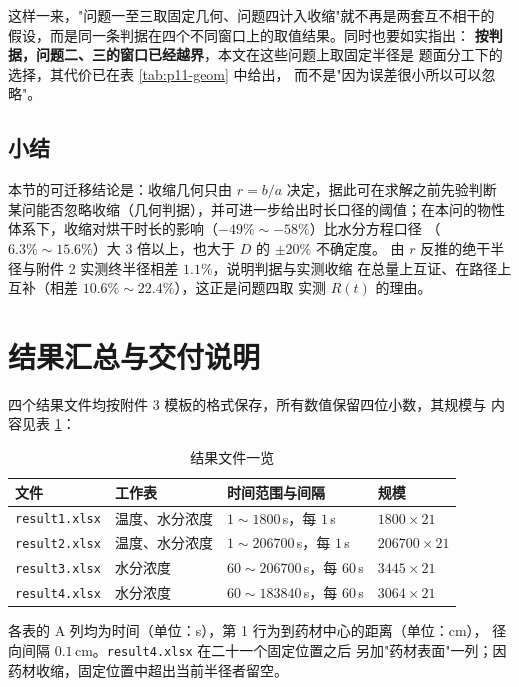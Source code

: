 \documentclass[12pt,a4paper,fontset=none]{ctexart}
\begin{document}
这样一来，"问题一至三取固定几何、问题四计入收缩"就不再是两套互不相干的
假设，而是同一条判据在四个不同窗口上的取值结果。同时也要如实指出：
\textbf{按判据，问题二、三的窗口已经越界}，本文在这些问题上取固定半径是
题面分工下的选择，其代价已在表 \ref{tab:p11-geom} 中给出，
而不是"因为误差很小所以可以忽略"。

\subsection{小结}

本节的可迁移结论是：收缩几何只由 $r=b/a$ 决定，据此可在求解之前先验判断
某问能否忽略收缩（几何判据），并可进一步给出时长口径的阈值；在本问的物性
体系下，收缩对烘干时长的影响（$-49\%\sim-58\%$）比水分方程口径
（$6.3\%\sim15.6\%$）大 $3$ 倍以上，也大于 $D$ 的 $\pm20\%$ 不确定度。
由 $r$ 反推的绝干半径与附件 2 实测终半径相差 $1.1\%$，说明判据与实测收缩
在总量上互证、在路径上互补（相差 $10.6\%\sim22.4\%$），这正是问题四取
实测 $R(t)$ 的理由。

\section{结果汇总与交付说明}

四个结果文件均按附件 3 模板的格式保存，所有数值保留四位小数，其规模与
内容见表 \ref{tab:files}：

\begin{table}[htbp]
  \centering
  \caption{结果文件一览}
  \label{tab:files}
  \small
  \begin{tabular}{llll}
    \toprule
    文件 & 工作表 & 时间范围与间隔 & 规模 \\
    \midrule
    \texttt{result1.xlsx} & 温度、水分浓度 & $1\sim1800$\,s，每 $1$\,s & $1800\times21$ \\
    \texttt{result2.xlsx} & 温度、水分浓度 & $1\sim206700$\,s，每 $1$\,s & $206700\times21$ \\
    \texttt{result3.xlsx} & 水分浓度 & $60\sim206700$\,s，每 $60$\,s & $3445\times21$ \\
    \texttt{result4.xlsx} & 水分浓度 & $60\sim183840$\,s，每 $60$\,s & $3064\times21$\\
    \bottomrule
  \end{tabular}
\end{table}

各表的 A 列均为时间（单位：s），第 1 行为到药材中心的距离（单位：cm），
径向间隔 $0.1$\,cm。\texttt{result4.xlsx} 在二十一个固定位置之后
另加"药材表面"一列；因药材收缩，固定位置中超出当前半径者留空。
\end{document}
